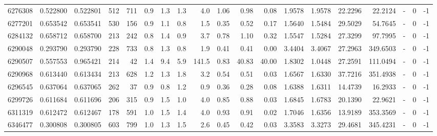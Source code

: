 \begin{tabular}{rrrrrrrrrrrrrrrrlrr}
   6276308 & 0.522800 &   0.522801 &  512 &  711 &      0.9 &      1.3 &     1.3 &      4.0 &       1.06 &        0.98 &        0.08 &  1.9578 &  1.9578 &   22.2296 &   22.2124 &             - &        0 &         -1 \\
   6277201 & 0.653542 &   0.653541 &  530 &  156 &      0.9 &      1.1 &     0.8 &      1.5 &       0.35 &        0.52 &        0.17 &  1.5640 &  1.5484 &   29.5029 &   54.7645 &             - &        0 &         -1 \\
   6284132 & 0.658712 &   0.658700 &  213 &  242 &      0.8 &      1.4 &     0.9 &      3.7 &       0.78 &        1.10 &        0.32 &  1.5547 &  1.5284 &   27.3299 &   97.7995 &             - &        0 &         -1 \\
   6290048 & 0.293790 &   0.293790 &  228 &  733 &      0.8 &      1.3 &     0.8 &      1.9 &       0.41 &        0.41 &        0.00 &  3.4404 &  3.4067 &   27.2963 &  349.6503 &             - &        0 &         -1 \\
   6290507 & 0.557553 &   0.965421 &  214 &   42 &      1.4 &      9.4 &     5.9 &    141.5 &       0.83 &       40.83 &       40.00 &  1.8302 &  1.0448 &   27.2591 &  111.0494 &             - &        0 &         -1 \\
   6290968 & 0.613440 &   0.613434 &  213 &  628 &      1.2 &      1.3 &     1.8 &      3.2 &       0.54 &        0.51 &        0.03 &  1.6567 &  1.6330 &   37.7216 &  351.4938 &             - &        0 &         -1 \\
   6296545 & 0.637064 &   0.637065 &  262 &   37 &      0.9 &      0.8 &     1.2 &      0.9 &       0.36 &        0.28 &        0.08 &  1.6388 &  1.6311 &   14.4739 &   16.2933 &             - &        0 &         -1 \\
   6299726 & 0.611684 &   0.611696 &  206 &  315 &      0.9 &      1.5 &     1.0 &      4.0 &       0.85 &        0.88 &        0.03 &  1.6845 &  1.6783 &   20.1390 &   22.9621 &             - &        0 &         -1 \\
   6311319 & 0.612472 &   0.612467 &  178 &  591 &      1.0 &      1.5 &     1.4 &      4.0 &       0.93 &        0.91 &        0.02 &  1.7046 &  1.6356 &   13.9189 &  353.3569 &             - &        0 &         -1 \\
   6346477 & 0.300808 &   0.300805 &  603 &  799 &      1.0 &      1.3 &     1.5 &      2.6 &       0.45 &        0.42 &        0.03 &  3.3583 &  3.3273 &   29.4681 &  345.4231 &             - &        0 &         -1 \\

\end{tabular}
